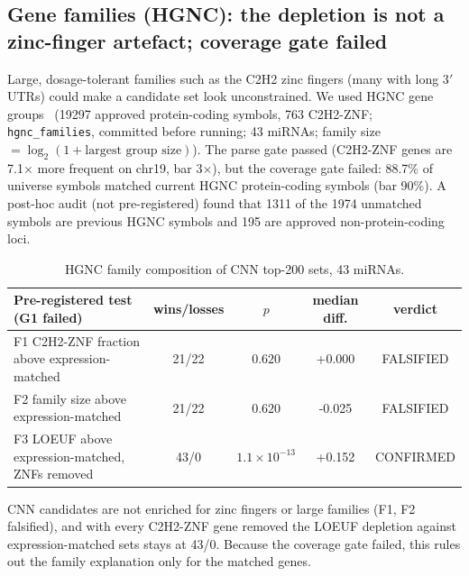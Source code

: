 \subsection{Gene families (HGNC): the depletion is not a zinc-finger artefact; coverage gate failed}
Large, dosage-tolerant families such as the C2H2 zinc fingers (many with long 3$'$UTRs) could make a candidate set look unconstrained. We used HGNC gene groups~\cite{hgnc} (19297 approved protein-coding symbols, 763 C2H2-ZNF; \texttt{hgnc\_families}, committed before running; 43 miRNAs; family size $=\log_2(1+\text{largest group size})$). The parse gate passed (C2H2-ZNF genes are 7.1$\times$ more frequent on chr19, bar 3$\times$), but the coverage gate failed: 88.7\% of universe symbols matched current HGNC protein-coding symbols (bar 90\%). A post-hoc audit (not pre-registered) found that 1311 of the 1974 unmatched symbols are previous HGNC symbols and 195 are approved non-protein-coding loci.
\begin{table}[h]\centering\small\begin{tabular}{lcccc}\hline Pre-registered test (G1 failed) & wins/losses & $p$ & median diff. & verdict\\\hline
F1 C2H2-ZNF fraction above expression-matched & 21/22 & $0.620$ & +0.000 & FALSIFIED \\
F2 family size above expression-matched & 21/22 & $0.620$ & -0.025 & FALSIFIED \\
F3 LOEUF above expression-matched, ZNFs removed & 43/0 & $1.1\times10^{-13}$ & +0.152 & CONFIRMED \\
\hline\end{tabular}\caption{HGNC family composition of CNN top-200 sets, 43 miRNAs.}\label{tab:hgnc}\end{table}
CNN candidates are not enriched for zinc fingers or large families (F1, F2 falsified), and with every C2H2-ZNF gene removed the LOEUF depletion against expression-matched sets stays at 43/0. Because the coverage gate failed, this rules out the family explanation only for the matched genes.
